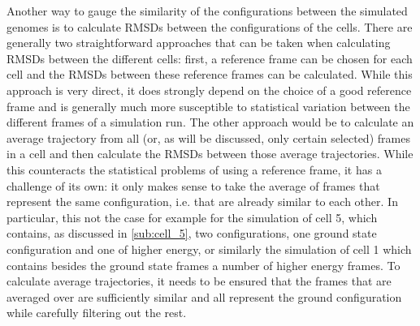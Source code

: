 Another way to gauge the similarity of the configurations between the simulated genomes is to calculate RMSDs between the configurations of the cells. There are generally two straightforward approaches that can be taken when calculating RMSDs between the different cells: first,  a reference frame can be chosen for each cell and the RMSDs between these reference frames can be calculated. While this approach is very direct, it does strongly depend on the choice of a good reference frame and is generally much more susceptible to statistical variation between the different frames of a simulation run. The other approach would be to calculate an average trajectory from all (or, as will be discussed, only certain selected) frames in a cell and then calculate the RMSDs between those average trajectories. While this counteracts the statistical problems of using a reference frame, it has a challenge of its own: it only makes sense to take the average of frames that represent the same configuration, i.e. that are already similar to each other. In particular, this not the case for example for the simulation of cell 5, which contains, as discussed in \ref{sub:cell_5}, two configurations, one ground state configuration and one of higher energy, or similarly the simulation of cell 1 which contains besides the ground state frames a number of higher energy frames. To calculate average trajectories, it needs to be ensured that the frames that are averaged over are sufficiently similar and all represent the ground configuration while carefully filtering out the rest.

